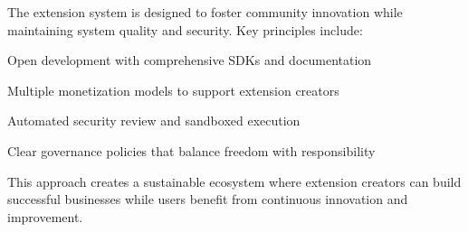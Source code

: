 The extension system is designed to foster community innovation while maintaining system quality and security. Key principles include:

\begin{compactlist}
    \item Open development with comprehensive SDKs and documentation
    \item Multiple monetization models to support extension creators
    \item Automated security review and sandboxed execution
    \item Clear governance policies that balance freedom with responsibility
\end{compactlist}

This approach creates a sustainable ecosystem where extension creators can build successful businesses while users benefit from continuous innovation and improvement.
